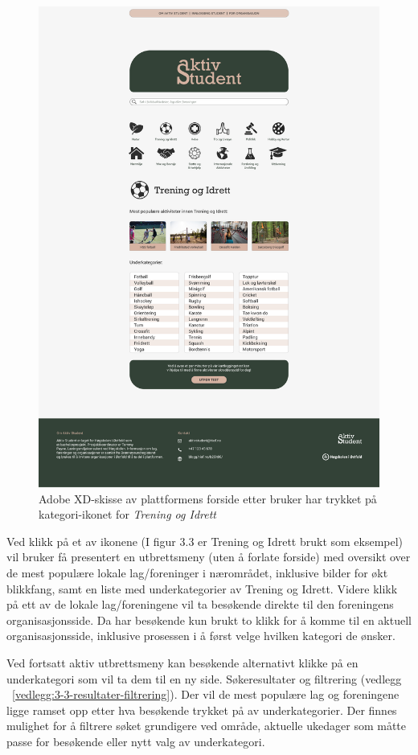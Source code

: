 \begin{figure}[H]
\centering
\includegraphics[width=.7\textwidth]{Illustrasjoner/Skisser-pdf/3.0/3-2-forside-trykket-kategori.pdf}
\caption{Adobe XD-skisse av plattformens forside etter bruker har trykket på kategori-ikonet for {\em Trening og Idrett}}
\label{fig:3-2-forside-utbrett}
\end{figure}


Ved klikk på et av ikonene (I figur 3.3 er Trening og Idrett brukt som eksempel) vil bruker få presentert en utbrettsmeny (uten å forlate forside) med oversikt over de mest populære lokale lag/foreninger i nærområdet, inklusive bilder for økt blikkfang, samt en liste med underkategorier av Trening og Idrett. Videre klikk på ett av de lokale lag/foreningene vil ta besøkende direkte til den foreningens organisasjonsside. Da har besøkende kun brukt to klikk for å komme til en aktuell organisasjonsside, inklusive prosessen i å først velge hvilken kategori de ønsker.

Ved fortsatt aktiv utbrettsmeny kan besøkende alternativt klikke på en underkategori som vil ta dem til en ny side. Søkeresultater og filtrering (vedlegg ~\ref{vedlegg:3-3-resultater-filtrering}). Der vil de mest populære lag og foreningene ligge ramset opp etter hva besøkende trykket på av underkategorier. Der finnes mulighet for å filtrere søket grundigere ved område, aktuelle ukedager som måtte passe for besøkende eller nytt valg av underkategori.

